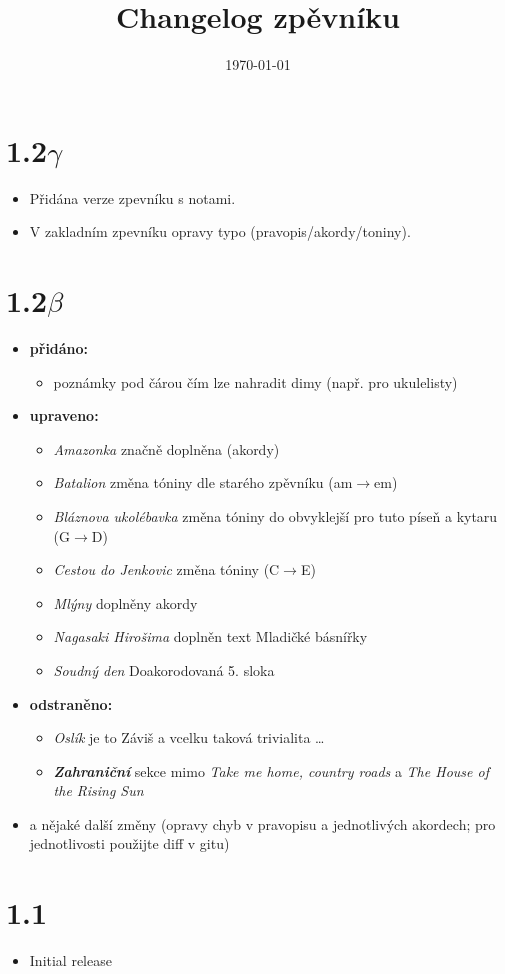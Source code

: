 \documentclass[11pt]{article}
\title{Changelog zpěvníku}
\date{\today}
\begin{document}
\maketitle

\section*{1.2$\gamma$}
\begin{itemize}
    \item Přidána verze zpevníku s notami.
    \item V zakladním zpevníku opravy typo (pravopis/akordy/toniny).
\end{itemize}
\section*{1.2$\beta$}
\begin{itemize}
    \item \textbf{přidáno:}
    \begin{itemize}
        \item poznámky pod čárou čím lze nahradit dimy (např. pro ukulelisty)
    \end{itemize}
    
    \item \textbf{upraveno:}
    \begin{itemize}
        \item \textit{Amazonka} značně doplněna (akordy)
        \item \textit{Batalion} změna tóniny dle starého zpěvníku (am$\rightarrow$em)
        \item \textit{Bláznova ukolébavka} změna tóniny do obvyklejší pro tuto píseň a kytaru (G$\rightarrow$D)
        \item \textit{Cestou do Jenkovic} změna tóniny (C$\rightarrow$E)
        \item \textit{Mlýny} doplněny akordy
        \item \textit{Nagasaki Hirošima} doplněn text Mladičké básnířky 
        \item \textit{Soudný den} Doakorodovaná  5. sloka 
        
    \end{itemize}
    
    \item \textbf{odstraněno:}
    \begin{itemize}
        \item \textit{Oslík} je to Záviš a vcelku taková trivialita \dots
        \item \textbf{\textit{Zahraniční}} sekce mimo \textit{Take me home, country roads} a \textit{The House of the Rising Sun}
        
    \end{itemize}

    \item a nějaké další změny (opravy chyb v pravopisu a jednotlivých akordech; pro jednotlivosti použijte diff v gitu)
    
\end{itemize}

\section*{1.1}
\begin{itemize}
    \item Initial release
\end{itemize}
\end{document}

